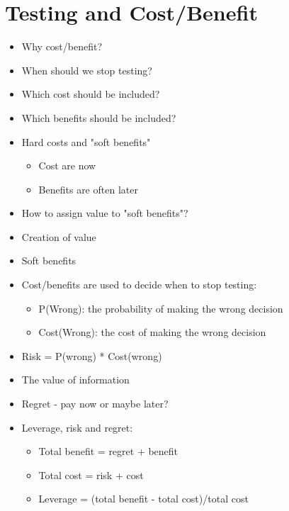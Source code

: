 	\section{Testing and Cost/Benefit}
		\begin{itemize}
			\item Why cost/benefit?
			\item When should we stop testing?
			\item Which cost should be included?
			\item Which benefits should be included?
			\item Hard costs and "soft benefits"
				\begin{itemize}		
				 	\item Cost are now
				 	\item Benefits are often later 
				 \end{itemize}
			\item How to assign value to "soft benefits"?
			\item Creation of value
			\item Soft benefits
			\item Cost/benefits are used to decide when to stop testing:
				\begin{itemize}
					\item P(Wrong): the probability of making the wrong decision
					\item Cost(Wrong): the cost of making the wrong decision
				\end{itemize}
			\item Risk = P(wrong) * Cost(wrong)
			\item The value of information
			\item Regret - pay now or maybe later?
			\item Leverage, risk and regret: 
				\begin{itemize}
					\item Total benefit = regret + benefit
					\item Total cost = risk + cost
					\item Leverage = (total benefit - total cost)/total cost
				\end{itemize}
		\end{itemize}


